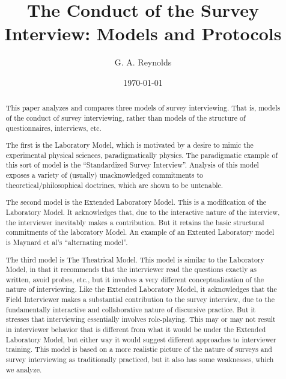 \documentclass[11pt,twoside]{article}
\title{The Conduct of the Survey Interview: Models and Protocols}
\author{G. A. Reynolds}
\date{\today}
\begin{document}
\maketitle
\nocite{*}

\begin{abstract}
This paper analyzes and compares three models of survey
interviewing.  That is, models of the conduct of survey interviewing,
rather than models of the structure of questionnaires, interviews,
etc.

The first is the Laboratory Model, which is motivated by a desire to
mimic the experimental physical sciences, paradigmatically physics.
The paradigmatic example of this sort of model is the ``Standardized
Survey Interview''.  Analysis of this model exposes a variety of
(usually) unacknowledged commitments to theoretical/philosophical
doctrines, which are shown to be untenable.

The second model is the Extended Laboratory Model.  This is a
modification of the Laboratory Model.  It acknowledges that, due to
the interactive nature of the interview, the interviewer inevitably
makes a contribution.  But it retains the basic structural commitments
of the laboratory Model.  An example of an Extented Laboratory model
is Maynard et al's ``alternating model''.

The third model is The Theatrical Model.  This model is similar to the
Laboratory Model, in that it recommends that the interviewer read the
questions exactly as written, avoid probes, etc., but it involves a
very different conceptualization of the nature of interviewing.  Like
the Extended Laboratory Model, it acknowledges that the Field
Interviewer makes a substantial contribution to the survey interview,
due to the fundamentally interactive and collaborative nature of
discursive practice.  But it stresses that interviewing essentially
involves role-playing.  This may or may not result in interviewer
behavior that is different from what it would be under the Extended
Laboratory Model, but either way it would suggest different approaches
to interviewer training.  This model is based on a more realistic
picture of the nature of surveys and survey interviewing as
traditionally practiced, but it also has some weaknesses, which we
analyze.


\end{abstract}
\end{document}
